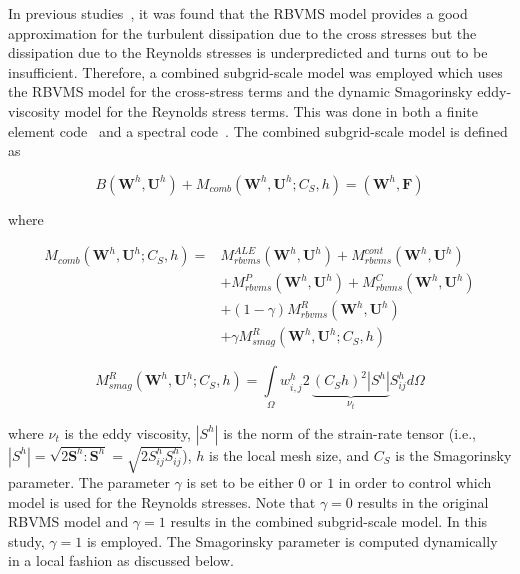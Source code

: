 In previous studies~\cite{bib:wang2010,bib:tran2017a}, it was found that the RBVMS model provides a good
approximation for the turbulent dissipation due to the cross stresses but the
dissipation due to the Reynolds stresses is underpredicted and turns out to be
insufficient. Therefore, a combined subgrid-scale model was employed which
uses the RBVMS model for the cross-stress terms
and the dynamic Smagorinsky eddy-viscosity model for the Reynolds stress terms.
This was done in both 
a finite element code~\cite{bib:tran2016,bib:tran2017a}
and a spectral code~\cite{bib:wang2010}.
The combined subgrid-scale model is defined as

\begin{equation}
\label{eq:NS_comb}
 B(\bm{W}^h,\bm{U}^h) + M_{comb}(\bm{W}^h,\bm{U}^h; C_S, h)  = (\bm{W}^h,\bm{F})
\end{equation}

\noindent where

\begin{equation}
\label{eq:NS_Mcomb}
\begin{split}
M_{comb}(\bm{W}^h,\bm{U}^h; C_S, h) =& M^{ALE}_{rbvms}(\bm{W}^h,\bm{U}^h) +M^{cont}_{rbvms}(\bm{W}^h, \bm{U}^h) \\
& + M^P_{rbvms}(\bm{W}^h, \bm{U}^h) + M^C_{rbvms}(\bm{W}^h, \bm{U}^h) \\
& + (1-\gamma) M^R_{rbvms}(\bm{W}^h, \bm{U}^h)
\\
& +\gamma M^R_{smag}(\bm{W}^h,\bm{U}^h; C_S, h)
\end{split}
\end{equation}

\begin{equation}
\label{eq:NS_Smag_sub}
M^R_{smag}(\bm{W}^h,\bm{U}^h; C_S, h) = \int\limits_\Omega w^h_{i,j} 2 \, \underbrace{(C_S h)^2 |S^h|}_{\nu_t} S^h_{ij} d\Omega
\end{equation}

\noindent where $\nu_t$ is the eddy viscosity, $|S^h|$ is the norm of the
strain-rate tensor (i.e., $|S^h|=\sqrt{2 \bm{S}^h : \bm{S}^h} = \sqrt{2 S^h_{ij} S^h_{ij}}$),
$h$ is the local mesh size,
and $C_S$ is the Smagorinsky parameter.
The parameter $\gamma$ is set to be either $0$ or $1$ in order to control
which model is used for the Reynolds stresses.
Note that $\gamma=0$ results in the
original RBVMS model and $\gamma=1$ results in the combined subgrid-scale model.
In this study, $\gamma=1$ is employed.
The Smagorinsky parameter is computed dynamically in a local fashion as discussed below.
